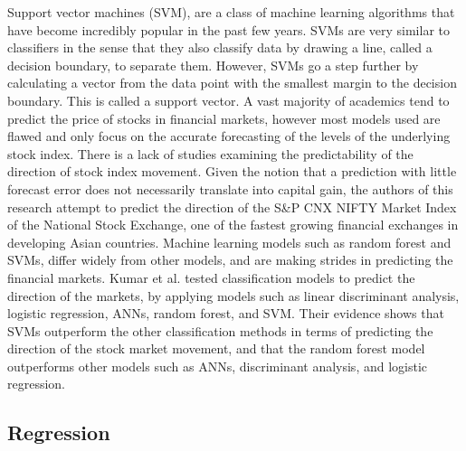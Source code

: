 Support vector machines (SVM), are a class of machine learning algorithms that have become incredibly popular in the past few years. SVMs are very similar to classifiers in the sense that they also classify data by drawing a line, called a decision boundary, to separate them. However, SVMs go a step further by calculating a vector from the data point with the smallest margin to the decision boundary. This is called a support vector. A vast majority of academics tend to predict the price of stocks in financial markets, however most models used are flawed and only focus on the accurate forecasting of the levels of the underlying stock index. There is a lack of studies examining the predictability of the direction of stock index movement. Given the notion that a prediction with little forecast error does not necessarily translate into capital gain, the authors of this research attempt to predict the direction of the S\&P CNX NIFTY Market Index of the National Stock Exchange, one of the fastest growing financial exchanges in developing Asian countries.\cite{Kumar:2016aa} Machine learning models such as random forest and SVMs, differ widely from other models, and are making strides in predicting the financial markets. Kumar et al. tested classification models to predict the direction of the markets, by applying models such as linear discriminant analysis, logistic regression, ANNs, random forest, and SVM. Their evidence shows that SVMs outperform the other classification methods in terms of predicting the direction of the stock market movement, and that the random forest model outperforms other models such as ANNs, discriminant analysis, and logistic regression.

\subsection{Regression}

